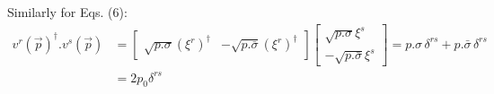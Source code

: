 \documentclass{article}
\newcommand{\vecp}{\vec{p}}
\begin{document}
Similarly for Eqs. (6):
\begin{equation}
    \begin{split}
        v^r(\vecp)^\dagger . v^s(\vecp) &= \begin{bmatrix}
            \sqrt{p.\sigma}(\xi^r)^\dagger & -\sqrt{p.\bar{\sigma}}(\xi^r)^\dagger
        \end{bmatrix}\begin{bmatrix}
            \sqrt{p.\sigma}\xi^s \\ -\sqrt{p.\bar{\sigma}}\xi^s
        \end{bmatrix} = p.\sigma \, \delta^{rs} + p.\bar{\sigma} \, \delta^{rs} \\
        & = 2p_0 \delta^{rs}
    \end{split}
\end{equation}
\end{document}

